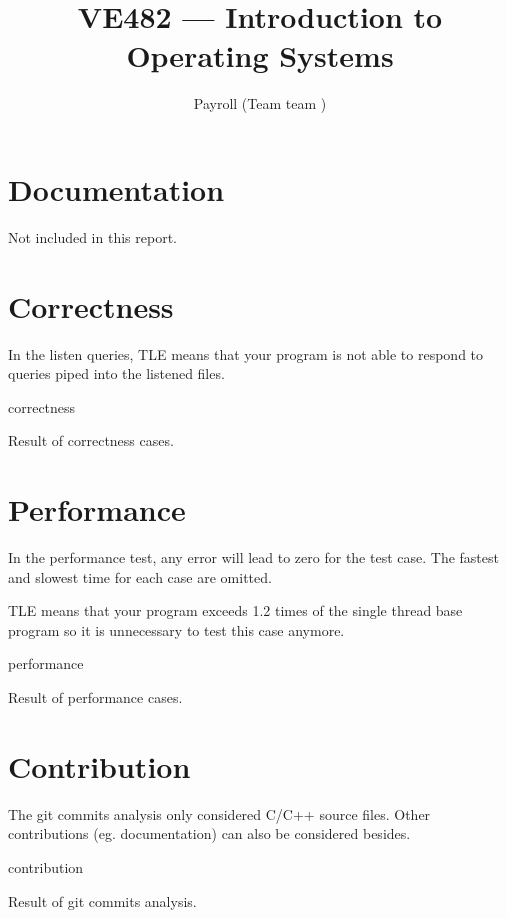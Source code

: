 \documentclass[landscape]{article}
\title{VE482 --- Introduction to\\ Operating Systems}
\subtitle{Payroll (Team {{ team }})}
\begin{document}
\maketitle

\section{Documentation}

Not included in this report.

\section{Correctness}

In the listen queries, {\color{red}TLE} means that your program is not able to respond to queries piped into the listened files.

\begin{table}[!htbp]
\centering
{{ correctness }}
\caption{Result of correctness cases.}
\end{table}

\newpage

\section{Performance}

In the performance test, any error will lead to zero for the test case. The fastest and slowest time for each case are omitted.

{\color{red}TLE} means that your program exceeds 1.2 times of the single thread base program so it is unnecessary to test this case anymore.

\begin{table}[!htbp]
\centering
{{ performance }}
\caption{Result of performance cases.}
\end{table}

\section{Contribution}

The git commits analysis only considered C/C++ source files. Other contributions (eg. documentation) can also be considered besides.

\begin{table}[!htbp]
\centering
{{ contribution }}
\caption{Result of git commits analysis.}
\end{table}

\newpage
\end{document}
